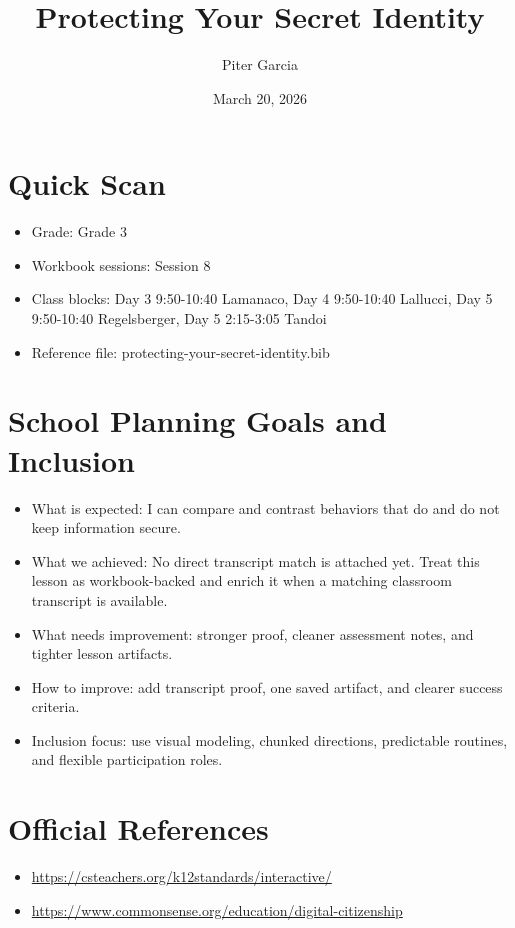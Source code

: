 \documentclass[11pt]{article}
\title{Protecting Your Secret Identity}
\author{Piter Garcia}
\date{March 20, 2026}
\begin{document}
    \maketitle
    \section*{Quick Scan}
    \begin{itemize}[leftmargin=*]
    \item Grade: Grade 3
    \item Workbook sessions: Session 8
    \item Class blocks: Day 3 9:50-10:40 Lamanaco, Day 4 9:50-10:40 Lallucci, Day 5 9:50-10:40 Regelsberger, Day 5 2:15-3:05 Tandoi
    \item Reference file: protecting-your-secret-identity.bib
    \end{itemize}
    \section*{School Planning Goals and Inclusion}
    \begin{itemize}[leftmargin=*]
    \item What is expected: I can compare and contrast behaviors that do and do not keep information secure.
    \item What we achieved: No direct transcript match is attached yet. Treat this lesson as workbook-backed and enrich it when a matching classroom transcript is available.
    \item What needs improvement: stronger proof, cleaner assessment notes, and tighter lesson artifacts.
    \item How to improve: add transcript proof, one saved artifact, and clearer success criteria.
    \item Inclusion focus: use visual modeling, chunked directions, predictable routines, and flexible participation roles.
    \end{itemize}
    \section*{Official References}
    \begin{itemize}[leftmargin=*]
    \item \url{https://csteachers.org/k12standards/interactive/}
\item \url{https://www.commonsense.org/education/digital-citizenship}

    \end{itemize}
    
\end{document}
